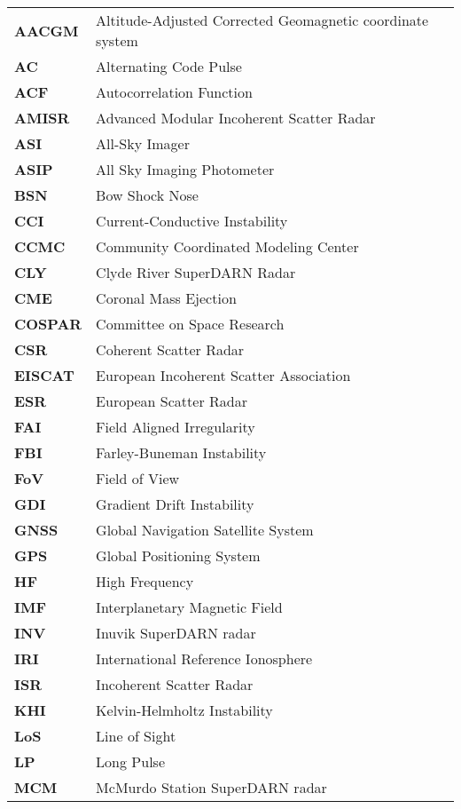 
\begin{longtable}{ll}
\textbf{AACGM} & Altitude-Adjusted Corrected Geomagnetic coordinate system \\
\textbf{AC} & Alternating Code Pulse \\
\textbf{ACF} & Autocorrelation Function \\
\textbf{AMISR} & Advanced Modular Incoherent Scatter Radar \\
\textbf{ASI} & All-Sky Imager \\
\textbf{ASIP} & All Sky Imaging Photometer \\
\textbf{BSN} & Bow Shock Nose \\
\textbf{CCI} & Current-Conductive Instability \\
\textbf{CCMC} & Community Coordinated Modeling Center \\
\textbf{CLY} & Clyde River SuperDARN Radar \\
\textbf{CME} & Coronal Mass Ejection \\
\textbf{COSPAR} & Committee on Space Research \\
\textbf{CSR} & Coherent Scatter Radar \\
\textbf{EISCAT} & European Incoherent Scatter Association \\
\textbf{ESR} & European Scatter Radar \\
\textbf{FAI} & Field Aligned Irregularity \\
\textbf{FBI} & Farley-Buneman Instability \\
\textbf{FoV} & Field of View \\
\textbf{GDI} & Gradient Drift Instability \\
\textbf{GNSS} & Global Navigation Satellite System \\
\textbf{GPS} & Global Positioning System \\
\textbf{HF} & High Frequency \\
\textbf{IMF} & Interplanetary Magnetic Field \\
\textbf{INV} & Inuvik SuperDARN radar \\
\textbf{IRI} & International Reference Ionosphere \\
\textbf{ISR} & Incoherent Scatter Radar \\
\textbf{KHI} & Kelvin-Helmholtz Instability \\
\textbf{LoS} & Line of Sight \\
\textbf{LP} & Long Pulse \\
\textbf{MCM} & McMurdo Station SuperDARN radar \\

\end{longtable}
